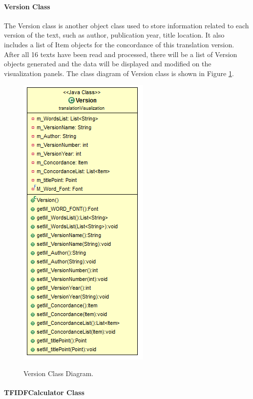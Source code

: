 \paragraph{Version Class}

\paragraph[]{}
The Version class is another object class used to store information related to each version of the text, such as author, publication year, title location. It also includes a list of Item objects for the concordance of this translation version. After all 16 texts have been read and processed, there will be a list of Version objects generated and the data will be displayed and modified on the visualization panels. The class diagram of Version class is shown in Figure \ref*{fig:version}.

\begin{figure}[H]
	\centering    
	\includegraphics[scale=0.9]{Figs/Version}\\[1ex]
	\caption{Version Class Diagram. }
	\label{fig:version}
\end{figure}

\paragraph{TFIDFCalculator Class}

